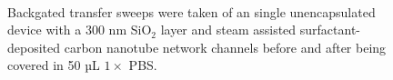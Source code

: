 \documentclass[
  a4paper,
]{scrbook}
\begin{document}
\begin{figure}
\begin{minipage}[t]{0.01\linewidth}
{\centering 

~

}

\end{minipage}%

\caption{\label{fig-buffer-effect-on-backgate}Backgated transfer sweeps
were taken of an single unencapsulated device with a 300 nm SiO\(_2\)
layer and steam assisted surfactant-deposited carbon nanotube network
channels before and after being covered in 50 µL \(1 \times\) PBS.}

\end{figure}

\begin{figure}

\begin{minipage}[t]{0.03\linewidth}

{\centering 


}

\end{minipage}%
%
\begin{minipage}[t]{0.01\linewidth}

{\centering 

~

}

\end{minipage}%
%
\begin{minipage}[t]{0.45\linewidth}

{\centering 

\raisebox{-\height}{

}}
\end{minipage}
\end{figure}
\end{document}
